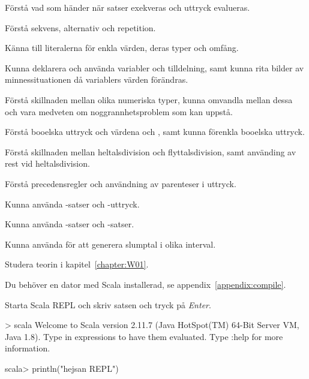 
\Exercise{\ExeWeekONE}\label{exe:W01}

\begin{Goals}
\item Förstå vad som händer när satser exekveras och uttryck evalueras.
\item Förstå sekvens, alternativ och repetition.
\item Känna till literalerna för enkla värden, deras typer och omfång.
\item Kunna deklarera och använda variabler och tilldelning, samt kunna rita bilder av minnessituationen då variablers värden förändras.
\item Förstå skillnaden mellan olika numeriska typer, kunna omvandla mellan dessa och vara medveten om noggrannhetsproblem som kan uppstå.
\item Förstå booelska uttryck och värdena  och , samt kunna förenkla booelska uttryck.
\item Förstå skillnaden mellan heltalsdivision och flyttalsdivision, samt använding av rest vid heltalsdivision.
\item Förstå precedensregler och användning av parenteser i uttryck.
\item Kunna använda -satser och -uttryck.
\item Kunna använda -satser och -satser.
\item Kunna använda  för att generera slumptal i olika interval.
\end{Goals}

\begin{Preparations}
\item Studera teorin i kapitel~\ref{chapter:W01}.
\item Du behöver en dator med Scala installerad, se appendix~\ref{appendix:compile}.
\end{Preparations}

\BasicTasks

\Task Starta Scala REPL  och skriv satsen  och tryck på \textit{Enter}. %

\begin{REPLnonum}
> scala
Welcome to Scala version 2.11.7 (Java HotSpot(TM) 64-Bit Server VM, Java 1.8).
Type in expressions to have them evaluated.
Type :help for more information.

scala> println("hejsan REPL")
\end{REPLnonum}

